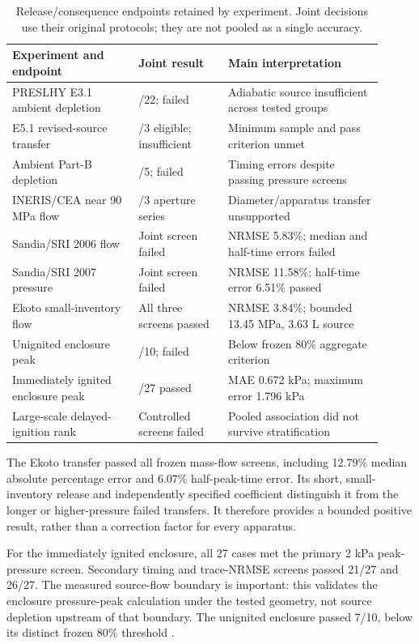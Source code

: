 \documentclass[12pt,a4paper]{article}
\begin{document}
\begin{table}[htbp]
\centering\small
\caption{Release/consequence endpoints retained by experiment. Joint decisions
use their original protocols; they are not pooled as a single accuracy.}
\label{tab:release-new}
\begin{tabular}{>{\raggedright\arraybackslash}p{0.31\linewidth}
                >{\raggedright\arraybackslash}p{0.22\linewidth}
                >{\raggedright\arraybackslash}p{0.38\linewidth}}
\toprule
Experiment and endpoint & Joint result & Main interpretation \\
\midrule
PRESLHY E3.1 ambient depletion & 11/22; failed & Adiabatic source insufficient across tested groups \\
E5.1 revised-source transfer & 2/3 eligible; insufficient & Minimum sample and pass criterion unmet \\
Ambient Part-B depletion & 3/5; failed & Timing errors despite passing pressure screens \\
INERIS/CEA near 90 MPa flow & 0/3 aperture series & Diameter/apparatus transfer unsupported \\
Sandia/SRI 2006 flow & Joint screen failed & NRMSE 5.83\%; median and half-time errors failed \\
Sandia/SRI 2007 pressure & Joint screen failed & NRMSE 11.58\%; half-time error 6.51\% passed \\
Ekoto small-inventory flow & All three screens passed & NRMSE 3.84\%; bounded 13.45 MPa, 3.63 L source \\
Unignited enclosure peak & 7/10; failed & Below frozen 80\% aggregate criterion \\
Immediately ignited enclosure peak & 27/27 passed & MAE 0.672 kPa; maximum error 1.796 kPa \\
Large-scale delayed-ignition rank & Controlled screens failed & Pooled association did not survive stratification \\
\bottomrule
\end{tabular}
\end{table}

The Ekoto transfer passed all frozen mass-flow screens, including 12.79\%
median absolute percentage error and 6.07\% half-peak-time error. Its short,
small-inventory release and independently specified coefficient distinguish it
from the longer or higher-pressure failed transfers. It therefore provides a
bounded positive result, rather than a correction factor for every apparatus.

For the immediately ignited enclosure, all 27 cases met the primary 2 kPa
peak-pressure screen. Secondary timing and trace-NRMSE screens passed 21/27
and 26/27. The measured source-flow boundary is important: this validates the
enclosure pressure-peak calculation under the tested geometry, not source
depletion upstream of that boundary. The unignited enclosure passed 7/10,
below its distinct frozen 80\% threshold \cite{lach2020}.
\end{document}
